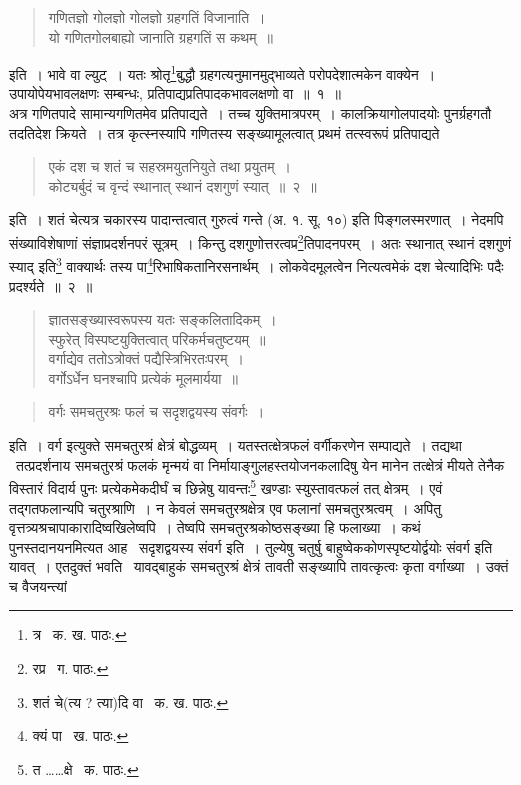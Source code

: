 \documentclass[11pt, openany]{book}
\begin{document}
{\begin{quote}
{\qt गणितज्ञो गोलज्ञो गोलज्ञो ग्रहगतिं विजानाति~।\\
यो गणितगोलबाह्यो जानाति ग्रहगतिं स कथम्~॥}
\end{quote}

\noindent इति~। भावे वा ल्युट्~। यतः श्रोतृ\renewcommand{\thefootnote}{३}\footnote{त्र \textendash\ क. ख. पाठः.}बुद्धौ ग्रहगत्यनुमानमुद्भाव्यते परोपदेशात्मकेन वाक्येन~। उपायोपेयभावलक्षणः सम्बन्धः, प्रतिपाद्यप्रतिपादकभावलक्षणो वा~॥~१~॥ \\

अत्र गणितपादे सामान्यगणितमेव प्रतिपाद्यते~। तच्च युक्तिमात्रपरम्~। कालक्रियागोलपादयोः पुनर्ग्रहगतौ तदतिदेश क्रियते~। तत्र कृत्स्नस्यापि गणितस्य सङ्ख्यामूलत्वात् प्रथमं तत्स्वरूपं प्रतिपाद्यते\textendash  

\begin{quote}
{\ab एकं दश च शतं च सहस्रमयुतनियुते तथा प्रयुतम्~।\\
कोट्यर्बुदं च वृन्दं स्थानात् स्थानं दशगुणं स्यात्~॥~२~॥}
\end{quote}

\newpage 

इति~। शतं चेत्यत्र चकारस्य पादान्तत्वात् गुरुत्वं {\qt गन्ते} (अ. १. सू. १०) इति पिङ्गलस्मरणात्~। नेदमपि संख्याविशेषाणां संज्ञाप्रदर्शनपरं सूत्रम्~। किन्तु दशगुणोत्तरत्वप्र\renewcommand{\thefootnote}{१}\footnote{रप्र \textendash\ ग. पाठः.}तिपादनपरम्~। अतः {\qt स्थानात् स्थानं दशगुणं स्याद्} इति\renewcommand{\thefootnote}{२}\footnote{शतं चे(त्य ? त्या)दि वा \textendash\ क. ख. पाठः.} वाक्यार्थः तस्य पा\renewcommand{\thefootnote}{३}\footnote{क्यं पा \textendash\ ख. पाठः.}रिभाषिकतानिरसनार्थम्~। लोकवेदमूलत्वेन नित्यत्वमेकं दश चेत्यादिभिः पदैः प्रदर्श्यते~॥~२~॥ 

\begin{quote}
{\qt ज्ञातसङ्ख्यास्वरूपस्य यतः सङ्कलितादिकम्~।\\
स्फुरेत् विस्पष्टयुक्तित्वात् परिकर्मचतुष्टयम्~॥\\
वर्गाद्येव ततोऽत्रोक्तं पद्यैस्त्रिभिरतःपरम्~।\\
वर्गोऽर्धेन घनश्चापि प्रत्येकं मूलमार्यया~॥}
\end{quote}

\begin{quote} 
{\ab वर्गः समचतुरश्रः फलं च सदृशद्वयस्य संवर्गः~।}
\end{quote} 

इति~। वर्ग इत्युक्ते समचतुरश्रं क्षेत्रं बोद्धव्यम्~। यतस्तत्क्षेत्रफलं वर्गीकरणेन सम्पाद्यते~। तद्यथा \textendash\ तत्प्रदर्शनाय समचतुरश्रं फलकं मृन्मयं वा निर्मायाङ्गुलहस्तयोजनकलादिषु येन मानेन तत्क्षेत्रं मीयते तेनैक विस्तारं विदार्य पुनः प्रत्येकमेकदीर्घं च छिन्नेषु यावन्तः\renewcommand{\thefootnote}{४}\footnote{त \ldots \ldots क्षे \textendash\ क. पाठः.} खण्डाः
स्युस्तावत्फलं तत् क्षेत्रम्~। एवं तद्गतफलान्यपि चतुरश्राणि~। न केवलं समचतुरश्रक्षेत्र एव फलानां समचतुरश्रत्वम्~। अपितु
वृत्तत्र्यश्रचापाकारादिष्वखिलेष्वपि~। तेष्वपि समचतुरश्रकोष्ठसङ्ख्या हि फलाख्या~। कथं पुनस्तदानयनमित्यत आह \textendash\ {\qt सदृशद्वयस्य संवर्ग} इति~। तुल्येषु चतुर्षु बाहुष्वेककोणस्पृष्टयोर्द्वयोः संवर्ग इति यावत्~। एतदुक्तं भवति \textendash\ यावद्बाहुकं
समचतुरश्रं क्षेत्रं तावती सङ्ख्यापि तावत्कृत्वः कृता वर्गाख्या~। उक्तं च वैजयन्त्यां\textendash 

}
\end{document}
